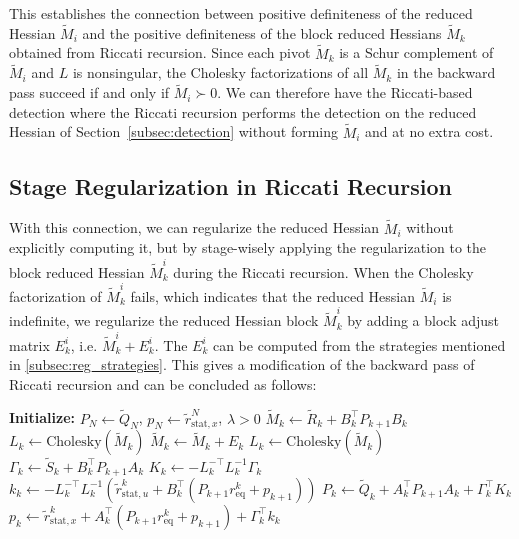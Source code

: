 \documentclass[class=scrbook, crop=false]{standalone}
\begin{document}
This establishes the connection between positive definiteness of the reduced Hessian $\tilde{M}_i$ 
and the positive definiteness of the block reduced Hessians $\tilde{M}_k$ obtained from Riccati recursion.
Since each pivot $\tilde{M}_k$ is a Schur complement of $\tilde{M}_i$ and $L$ is nonsingular,
the Cholesky factorizations of all $\tilde{M}_k$ in the backward pass succeed if and only if $\tilde{M}_i \succ 0$.
We can therefore have the Riccati-based detection where the Riccati recursion 
performs the detection on the reduced Hessian of Section~\ref{subsec:detection} without forming $\tilde{M}_i$ and at no extra cost.

\subsection{Stage Regularization in Riccati Recursion}
\label{subsec:stage_regularization}
With this connection, we can regularize the reduced Hessian $\tilde{M}_i$ without explicitly computing it, 
but by stage-wisely applying the regularization to the block reduced Hessian $\tilde{M}_k^i$ during the Riccati recursion.
When the Cholesky factorization of $\tilde{M}_k^i$ fails, which indicates that the reduced Hessian $\tilde{M}_i$ is indefinite,
we regularize the reduced Hessian block $\tilde{M}_k^i$ by adding a block adjust matrix $E_k^i$, i.e. $\tilde{M}_k^i + E_k^i$.
The $E_k^i$ can be computed from the strategies mentioned in \ref{subsec:reg_strategies}.
This gives a modification of the backward pass of Riccati recursion and can be concluded as follows:
\begin{algorithm}[H]
\caption{Backward Pass of Modified Riccati Recursion}
\label{alg:modified_riccati_recursion}
\begin{algorithmic}[1]
\State\textbf{Initialize:} $P_N \gets \tilde{Q}_N$, $p_N \gets \tilde{r}_{\mathrm{stat}, x}^N$, $\lambda > 0$
\Statex 
{}
    \State $\tilde{M}_k \gets \tilde{R}_k + B_k^\top P_{k+1} B_k$
    \State $L_k \gets \mathrm{Cholesky}(\tilde{M}_k)$
        \State $\tilde{M}_k \gets \tilde{M}_k + E_k$ 
        \State $L_k \gets \mathrm{Cholesky}(\tilde{M}_k)$
    \EndIf
    \State $\Gamma_k \gets \tilde{S}_k + B_k^\top P_{k+1} A_k$
    \Statex
    \State $K_k \gets -L_k^{-\top} L_k^{-1} \Gamma_k$
    \State $k_k \gets -L_k^{-\top} L_k^{-1} \left(\tilde{r}_{\mathrm{stat}, u}^k + B_k^\top (P_{k+1} r_{\mathrm{eq}}^k + p_{k+1})\right)$
    \Statex
    \State $P_k \gets \tilde{Q}_k + A_k^\top P_{k+1} A_k + \Gamma_k^\top K_k$
    \State $p_k \gets \tilde{r}_{\mathrm{stat}, x}^k + A_k^\top (P_{k+1} r_{\mathrm{eq}}^k + p_{k+1}) + \Gamma_k^\top k_k$
\EndFor
\end{algorithmic}
\end{algorithm}
\end{document}
